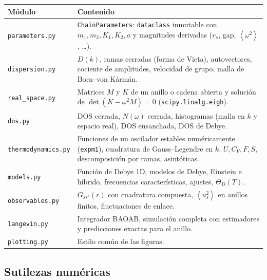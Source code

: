 \documentclass[11pt,a4paper]{article}
\newcommand{\avg}[1]{\left\langle #1\right\rangle}
\newcommand{\vs}{v_{s}}
\newcommand{\code}[1]{\texttt{#1}}
\begin{document}
\begin{center}
\small
\begin{tabularx}{\textwidth}{@{}l X@{}}
\toprule
Módulo & Contenido\\
\midrule
\code{parameters.py} & \code{ChainParameters}: \code{dataclass} inmutable con $m_1,m_2,K_1,K_2,a$ y magnitudes derivadas ($\vs$, gap, $\avg{\omega^2}$, \dots).\\
\code{dispersion.py} & $D(k)$, ramas cerradas (forma de Vieta), autovectores, cociente de amplitudes, velocidad de grupo, malla de Born–von Kármán.\\
\code{real\_space.py} & Matrices $M$ y $K$ de un anillo o cadena abierta y solución de $\det(K-\omega^2M)=0$ (\code{scipy.linalg.eigh}).\\
\code{dos.py} & DOS cerrada, $N(\omega)$ cerrada, histogramas (malla en $k$ y espacio real), DOS ensanchada, DOS de Debye.\\
\code{thermodynamics.py} & Funciones de un oscilador estables numéricamente (\code{expm1}), cuadratura de Gauss–Legendre en $k$, $U,C_V,F,S$, descomposición por ramas, asintóticas.\\
\code{models.py} & Función de Debye 1D, modelos de Debye, Einstein e híbrido, frecuencias características, ajustes, $\Theta_D(T)$.\\
\code{observables.py} & $G_{ss'}(r)$ con cuadratura compuesta, $\avg{u_s^2}$ en anillos finitos, fluctuaciones de enlace.\\
\code{langevin.py} & Integrador BAOAB, simulación completa con estimadores y predicciones exactas para el anillo.\\
\code{plotting.py} & Estilo común de las figuras.\\
\bottomrule
\end{tabularx}
\end{center}

\subsection{Sutilezas numéricas}
\end{document}
